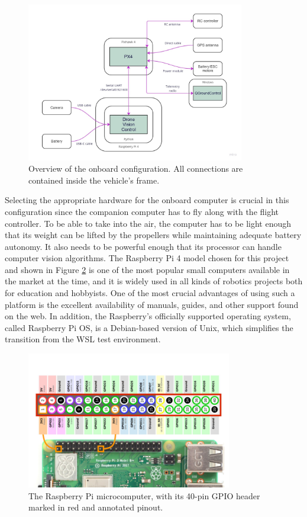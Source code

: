 \begin{figure}[b!]
  \centering
  \includegraphics[width=0.85\textwidth,keepaspectratio]{img/onboard-diagram.jpg}
  \caption{Overview of the onboard configuration. All connections are contained inside the vehicle's frame.}
  \label{fig:onboard-config}
\end{figure}


Selecting the appropriate hardware for the onboard computer is crucial in this configuration since the companion computer has to fly along with the flight controller. 
To be able to take into the air, the computer has to be light enough that its weight can be lifted by the propellers while maintaining adequate battery autonomy.
It also needs to be powerful enough that its processor can handle computer vision algorithms.
The Raspberry Pi 4 model chosen for this project and shown in Figure \ref{fig:rpi4-pinout} is one of the most popular small computers available in the market at the time, and it is widely used in all kinds of robotics projects both for education and hobbyists. 
One of the most crucial advantages of using such a platform is the excellent availability of manuals, guides, and other support found on the web. 
In addition, the Raspberry’s officially supported operating
system, called Raspberry Pi OS, is a Debian-based version of Unix, which simplifies the transition from the WSL test environment.

\begin{figure}[H]
  \centering
  \includegraphics[width=0.8\textwidth,keepaspectratio]{img/rpi4-pinout.png}
  \caption{The Raspberry Pi microcomputer, with its 40-pin GPIO header marked in red and annotated pinout.}
  \label{fig:rpi4-pinout}
\end{figure}

